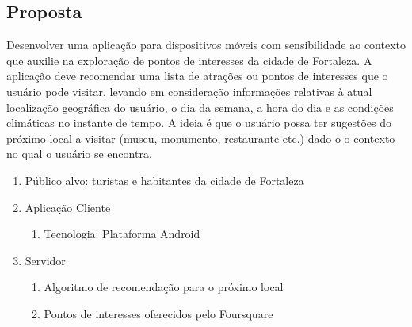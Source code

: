 \documentclass[10pt,a4paper,twocolumn]{article}
\begin{document}
\subsection{Proposta}
Desenvolver uma aplicação para dispositivos móveis com sensibilidade ao contexto que auxilie na exploração de pontos de interesses da cidade de Fortaleza. A aplicação deve recomendar uma lista de atrações ou pontos de interesses que o usuário pode visitar, levando em consideração informações relativas à atual localização geográfica do usuário, o dia da semana, a hora do dia e as condições climáticas no instante de tempo. A ideia é que o usuário possa ter sugestões do próximo local a visitar (museu, monumento, restaurante etc.) dado o o contexto no qual o usuário se encontra.
\begin{enumerate}
\item Público alvo: turistas e habitantes da cidade de Fortaleza
\item Aplicação Cliente
\begin{enumerate}
\item Tecnologia: Plataforma Android \cite{Android}
\end{enumerate}
\item Servidor
\begin{enumerate}
\item Algoritmo de recomendação para o próximo local
\item Pontos de interesses oferecidos pelo Foursquare \cite{Foursquare}
\end{enumerate}

\end{enumerate}



\end{document}
